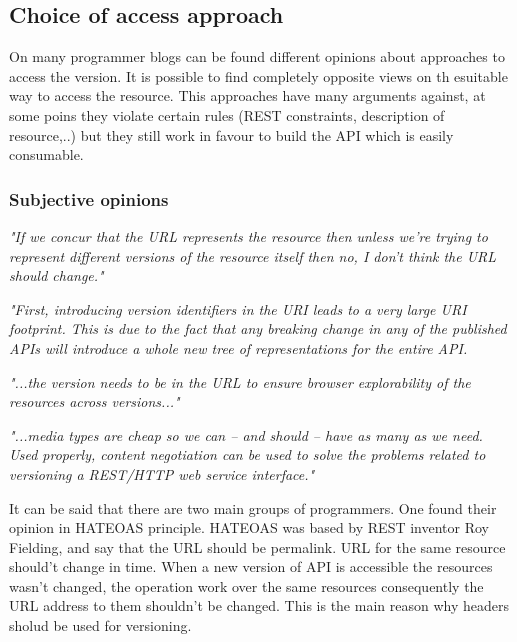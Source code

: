\subsection{Choice of access approach}

On many programmer blogs can be found different opinions about approaches to access the version. It is possible to find completely opposite views on th esuitable way to access the resource. This approaches have many arguments against, at some poins they violate certain rules (REST constraints, description of resource,..) but they still work in favour to build the API which is easily consumable.

\subsubsection{Subjective opinions}

\emph{"If we concur that the URL represents the resource then unless we’re trying to represent different versions of the resource itself then no, I don’t think the URL should change."\cite{website:wrong-ways}}
\bigskip

\emph{"First, introducing version identifiers in the URI leads to a very large URI footprint. This is due to the fact that any breaking change in any of the published APIs will introduce a whole new tree of representations for the entire API.\cite{website:versioning-rest-api}}
\bigskip

\emph{"...the version needs to be in the URL to ensure browser explorability of the resources across versions..."\cite{website:best-practices-rest}}
\bigskip

\emph{"...media types are cheap so we can – and should – have as many as we need. Used properly, content negotiation can be used to solve the problems related to versioning a REST/HTTP web service interface."\cite{website:versioning-rest-web-services}}
\bigskip


It can be said that there are two main groups of programmers. One found their opinion in HATEOAS principle. HATEOAS was based by REST inventor Roy Fielding, and say that the URL should be permalink. URL for the same resource should't change in time. When a new version of API is accessible the resources wasn't changed, the operation work over the same resources consequently the URL address to them shouldn't be changed. This is the main reason why headers sholud be used for versioning. 

